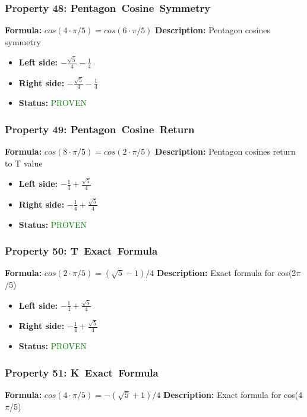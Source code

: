 \subsubsection*{Property 48: Pentagon~Cosine~Symmetry}
\textbf{Formula:} $cos(4 \cdot \pi/5) = cos(6 \cdot \pi/5)$
\textbf{Description:} Pentagon cosines symmetry

\begin{itemize}
\item \textbf{Left side:} $- \frac{\sqrt{5}}{4} - \frac{1}{4}$
\item \textbf{Right side:} $- \frac{\sqrt{5}}{4} - \frac{1}{4}$
\item \textbf{Status:} \textcolor{green}{PROVEN}
\end{itemize}

\subsubsection*{Property 49: Pentagon~Cosine~Return}
\textbf{Formula:} $cos(8 \cdot \pi/5) = cos(2 \cdot \pi/5)$
\textbf{Description:} Pentagon cosines return to T value

\begin{itemize}
\item \textbf{Left side:} $- \frac{1}{4} + \frac{\sqrt{5}}{4}$
\item \textbf{Right side:} $- \frac{1}{4} + \frac{\sqrt{5}}{4}$
\item \textbf{Status:} \textcolor{green}{PROVEN}
\end{itemize}

\subsubsection*{Property 50: T~Exact~Formula}
\textbf{Formula:} $cos(2 \cdot \pi/5) = (\sqrt{5}-1)/4$
\textbf{Description:} Exact formula for cos(2$\pi$/5)

\begin{itemize}
\item \textbf{Left side:} $- \frac{1}{4} + \frac{\sqrt{5}}{4}$
\item \textbf{Right side:} $- \frac{1}{4} + \frac{\sqrt{5}}{4}$
\item \textbf{Status:} \textcolor{green}{PROVEN}
\end{itemize}

\subsubsection*{Property 51: K~Exact~Formula}
\textbf{Formula:} $cos(4 \cdot \pi/5) = -(\sqrt{5}+1)/4$
\textbf{Description:} Exact formula for cos(4$\pi$/5)

